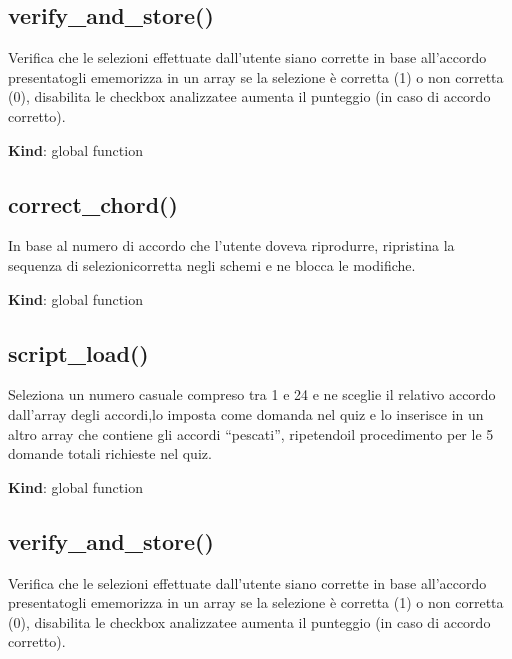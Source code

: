 \hypertarget{verify_and_store-1}{%
\subsection{verify\_and\_store()}\label{verify_and_store-1}}

Verifica che le selezioni effettuate dall'utente siano corrette in base
all'accordo presentatogli ememorizza in un array se la selezione è
corretta (1) o non corretta (0), disabilita le checkbox analizzatee
aumenta il punteggio (in caso di accordo corretto).

\textbf{Kind}: global function\\
\protect\hypertarget{correct_chord}{}{}

\hypertarget{correct_chord-1}{%
\subsection{correct\_chord()}\label{correct_chord-1}}

In base al numero di accordo che l'utente doveva riprodurre, ripristina
la sequenza di selezionicorretta negli schemi e ne blocca le modifiche.

\textbf{Kind}: global function\\
\protect\hypertarget{script_load}{}{}

\hypertarget{script_load-2}{%
\subsection{script\_load()}\label{script_load-2}}

Seleziona un numero casuale compreso tra 1 e 24 e ne sceglie il relativo
accordo dall'array degli accordi,lo imposta come domanda nel quiz e lo
inserisce in un altro array che contiene gli accordi ``pescati'',
ripetendoil procedimento per le 5 domande totali richieste nel quiz.

\textbf{Kind}: global function\\
\protect\hypertarget{verify_and_store}{}{}

\hypertarget{verify_and_store-2}{%
\subsection{verify\_and\_store()}\label{verify_and_store-2}}

Verifica che le selezioni effettuate dall'utente siano corrette in base
all'accordo presentatogli ememorizza in un array se la selezione è
corretta (1) o non corretta (0), disabilita le checkbox analizzatee
aumenta il punteggio (in caso di accordo corretto).

